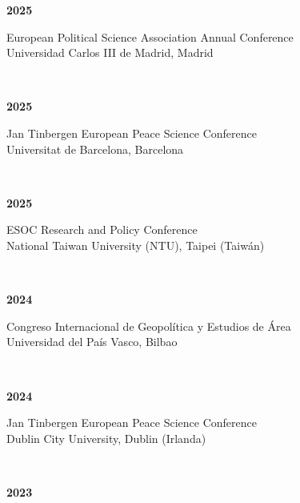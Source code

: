 \documentclass[a4paper, 12pt]{article}
\begin{document}
{\noindent
\begin{minipage}[t]{0.1\textwidth}
\textbf{2025}
\end{minipage}\hfill\begin{minipage}[t]{0.9\textwidth}
European Political Science Association Annual Conference\\
Universidad Carlos III de Madrid, Madrid\\
\end{minipage}\\
\begin{minipage}[t]{0.1\textwidth}
\textbf{2025}
\end{minipage}\hfill\begin{minipage}[t]{0.9\textwidth}
Jan Tinbergen European Peace Science Conference\\
Universitat de Barcelona, Barcelona\\
\end{minipage}\\
\begin{minipage}[t]{0.1\textwidth}
\textbf{2025}
\end{minipage}\hfill\begin{minipage}[t]{0.9\textwidth}
ESOC Research and Policy Conference\\
National Taiwan University (NTU), Taipei (Taiwán)\\
\end{minipage}\\
\begin{minipage}[t]{0.1\textwidth}
\textbf{2024}
\end{minipage}\hfill\begin{minipage}[t]{0.9\textwidth}
Congreso Internacional de Geopolítica y Estudios de Área\\
Universidad del País Vasco, Bilbao\\
\end{minipage}\\
\begin{minipage}[t]{0.1\textwidth}
\textbf{2024}
\end{minipage}\hfill\begin{minipage}[t]{0.9\textwidth}
Jan Tinbergen European Peace Science Conference\\
Dublin City University, Dublin (Irlanda)\\
\end{minipage}\\
\begin{minipage}[t]{0.1\textwidth}
\textbf{2023}
\end{minipage}\hfill\begin{minipage}[t]{0.9\textwidth}

\end{minipage}}
\end{document}
